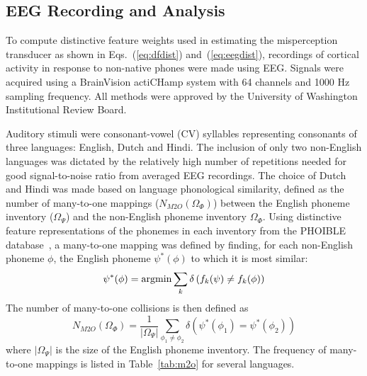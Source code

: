 \subsection{EEG Recording and Analysis}
\label{sec:methods_eeg}

To compute distinctive feature weights used in estimating the misperception
transducer as shown in Eqs.~(\ref{eq:dfdist}) and~(\ref{eq:eegdist}),
recordings of cortical activity in response to non-native phones were
made using EEG. Signals were acquired using a BrainVision actiCHamp 
system with 64 channels and 1000 Hz sampling frequency.
All methods were approved by the University of Washington Institutional
Review Board.

Auditory stimuli were consonant-vowel
(CV) syllables representing consonants of three languages: English,
Dutch and Hindi. The inclusion of only two non-English languages 
was dictated by the relatively high number of
repetitions needed for good signal-to-noise ratio from averaged
EEG recordings. The choice of Dutch and Hindi was made based on language
phonological similarity, defined as the number of many-to-one mappings
($N_{M2O}(\Omega_\Phi)$) between the English phoneme inventory
($\Omega_\Psi$) and the non-English phoneme inventory $\Omega_\Phi$.
Using distinctive feature representations of the phonemes in each
inventory from the PHOIBLE database~\cite{phoible}, a many-to-one 
mapping was defined by finding, for each
non-English phoneme $\phi$, the English phoneme $\psi^*(\phi)$ to which
it is most similar:
\begin{equation}
  \psi^*(\phi) = \operatorname*{argmin} \sum_k \delta\left(f_k(\psi)\ne f_k(\phi)\right)
\end{equation}
The number of many-to-one collisions is then defined as
\begin{equation}
  N_{M2O}(\Omega_\Phi)=\frac{1}{|\Omega_\Psi|}\sum_{\phi_1\ne\phi_2}
  \delta\left(\psi^*(\phi_1)=\psi^*(\phi_2)\right)
\label{eq:m2o}
\end{equation}
where $|\Omega_\Psi|$ is the size of the English phoneme inventory.
The frequency of many-to-one mappings is listed in
Table~\ref{tab:m2o} for several languages.

